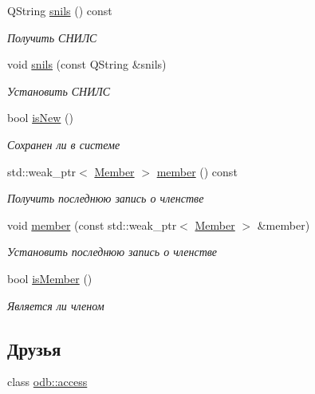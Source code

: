 \begin{DoxyCompactItemize}
Q\+String \hyperlink{classkpk_1_1data_1_1_person_ab97dd46a638436924b55be08e40fbd58}{snils} () const 
\begin{DoxyCompactList}\small\item\em Получить СНИЛС \end{DoxyCompactList}\item 
void \hyperlink{classkpk_1_1data_1_1_person_a110fad1e7ae404890ba536f6673f0d72}{snils} (const Q\+String \&snils)
\begin{DoxyCompactList}\small\item\em Установить СНИЛС \end{DoxyCompactList}\item 
bool \hyperlink{classkpk_1_1data_1_1_person_a102c06e6a83c60a46738fbbb46802b3b}{is\+New} ()
\begin{DoxyCompactList}\small\item\em Сохранен ли в системе \end{DoxyCompactList}\item 
std\+::weak\+\_\+ptr$<$ \hyperlink{classkpk_1_1data_1_1_member}{Member} $>$ \hyperlink{classkpk_1_1data_1_1_person_a2aa5f4a78eb6490e72dc099ab9076e54}{member} () const 
\begin{DoxyCompactList}\small\item\em Получить последнюю запись о членстве \end{DoxyCompactList}\item 
void \hyperlink{classkpk_1_1data_1_1_person_acc17c11bcc2f63ff0e8a325c926d7600}{member} (const std\+::weak\+\_\+ptr$<$ \hyperlink{classkpk_1_1data_1_1_member}{Member} $>$ \&member)
\begin{DoxyCompactList}\small\item\em Установить последнюю запись о членстве \end{DoxyCompactList}\item 
bool \hyperlink{classkpk_1_1data_1_1_person_ab437e28e5004a3961c14c650fc99ee69}{is\+Member} ()
\begin{DoxyCompactList}\small\item\em Является ли членом \end{DoxyCompactList}\end{DoxyCompactItemize}
\subsection*{Друзья}
\begin{DoxyCompactItemize}
\item 
class \hyperlink{classkpk_1_1data_1_1_person_acb4d953abf85ae525f1d06a0c3a86a55}{odb\+::access}
\end{DoxyCompactItemize}


